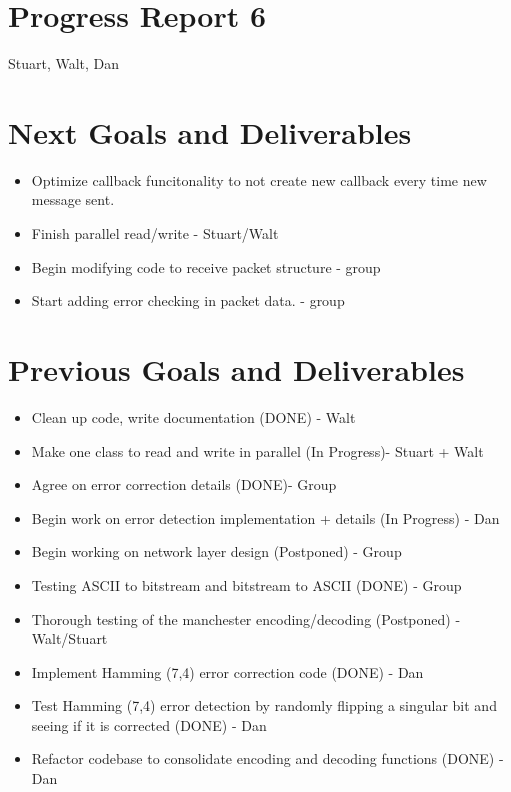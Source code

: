 \documentclass{article}
\begin{document}
\section*{Progress Report 6}
Stuart, Walt, Dan

\section*{Next Goals and Deliverables}
\begin{itemize}
    \item Optimize callback funcitonality to not create new callback every time new message sent.

    \item Finish parallel read/write - Stuart/Walt
    \item Begin modifying code to receive packet structure - group
    \item Start adding error checking in packet data. - group
\end{itemize}

\section*{Previous Goals and Deliverables}
\begin{itemize}
    \item Clean up code, write documentation (DONE) - Walt
    \item Make one class to read and write in parallel (In Progress)- Stuart + Walt
    \item Agree on error correction details (DONE)- Group
    \item Begin work on error detection implementation + details (In Progress) - Dan
    \item Begin working on network layer design (Postponed) - Group
    \item Testing ASCII to bitstream and bitstream to ASCII (DONE) - Group
    \item Thorough testing of the manchester encoding/decoding (Postponed) - Walt/Stuart


    \item Implement Hamming (7,4) error correction code (DONE) - Dan
    \item Test Hamming (7,4) error detection by randomly flipping a singular bit and seeing if it is corrected (DONE) - Dan
    \item Refactor codebase to consolidate encoding and decoding functions (DONE) - Dan
\end{itemize}
\end{document}
